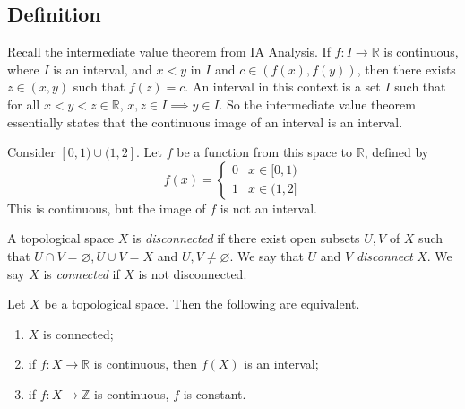 \subsection{Definition}
Recall the intermediate value theorem from IA Analysis.
If \( f \colon I \to \mathbb R \) is continuous, where \( I \) is an interval, and \( x < y \) in \( I \) and \( c \in (f(x), f(y)) \), then there exists \( z \in (x,y) \) such that \( f(z) = c \).
An interval in this context is a set \( I \) such that for all \( x<y<z \in \mathbb R \), \( x,z \in I \implies y \in I \).
So the intermediate value theorem essentially states that the continuous image of an interval is an interval.
\begin{example}
	Consider \( [0,1) \cup (1,2] \).
	Let \( f \) be a function from this space to \( \mathbb R \), defined by
	\[
		f(x) = \begin{cases}
			0 & x \in [0,1) \\
			1 & x \in (1,2]
		\end{cases}
	\]
	This is continuous, but the image of \( f \) is not an interval.
\end{example}
\begin{definition}
	A topological space \( X \) is \textit{disconnected} if there exist open subsets \( U, V \) of \( X \) such that \( U \cap V = \varnothing, U \cup V = X \) and \( U, V \neq \varnothing \).
	We say that \( U \) and \( V \) \textit{disconnect} \( X \).
	We say \( X \) is \textit{connected} if \( X \) is not disconnected.
\end{definition}
\begin{theorem}
	Let \( X \) be a topological space.
	Then the following are equivalent.
	\begin{enumerate}
		\item \( X \) is connected;
		\item if \( f \colon X \to \mathbb R \) is continuous, then \( f(X) \) is an interval;
		\item if \( f \colon X \to \mathbb Z \) is continuous, \( f \) is constant.
	\end{enumerate}
\end{theorem}
